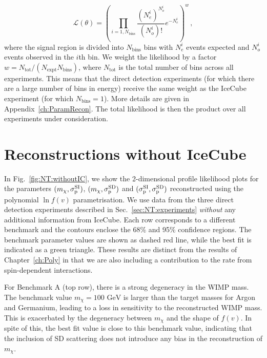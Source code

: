 \begin{equation}
\mathcal{L}(\theta) = \left(\prod_{i = 1, N_\textrm{bins}} \frac{(N_e^i)^{N_o^i}}{(N_o^i)!}e^{-N_e^i}\right)^{w}\,,
\end{equation}
where the signal region is divided into $N_\textrm{bins}$ bins with $N_e^i$ events expected and $N_o^i$ events observed in the $i$th bin. We weight the likelihood by a factor $w = N_\textrm{tot}/(N_\textrm{expt}N_\textrm{bins})$, where $N_\textrm{tot}$ is the total number of bins across all experiments. This means that the direct detection experiments (for which there are a large number of bins in energy) receive the same weight as the IceCube experiment (for which $N_\textrm{bins} = 1$). More details are given in Appendix~\ref{ch:ParamRecon}. The total likelihood is then the product over all experiments under consideration.

\section{Reconstructions without IceCube}
\label{sec:NT:withoutIC}

In Fig.~\ref{fig:NT:withoutIC}, we show the 2-dimensional profile likelihood plots for the parameters $(m_\chi, \sigmapsi)$, $(m_\chi, \sigmapsd)$ and $(\sigmapsi, \sigmapsd)$ reconstructed using the polynomial $\ln f(v)$ parametrisation. We use data from the three direct detection experiments described in Sec.~\ref{sec:NT:experiments} \textit{without} any additional information from IceCube. Each row corresponds to a different benchmark and the contours enclose the 68\% and 95\% confidence regions. The benchmark parameter values are shown as dashed red line, while the best fit is indicated as a green triangle. These results are distinct from the results of Chapter~\ref{ch:Poly} in that we are also including a contribution to the rate from spin-dependent interactions.

For Benchmark A (top row), there is a strong degeneracy in the WIMP mass. The benchmark value $m_\chi = 100 \textrm{ GeV}$ is larger than the target masses for Argon and Germanium, leading to a loss in sensitivity to the reconstructed WIMP mass. This is exacerbated by the degeneracy between $m_\chi$ and the shape of $f(v)$.  In spite of this, the best fit value is close to this benchmark value, indicating that the inclusion of SD scattering does not introduce any bias in the reconstruction of $m_\chi$. 

